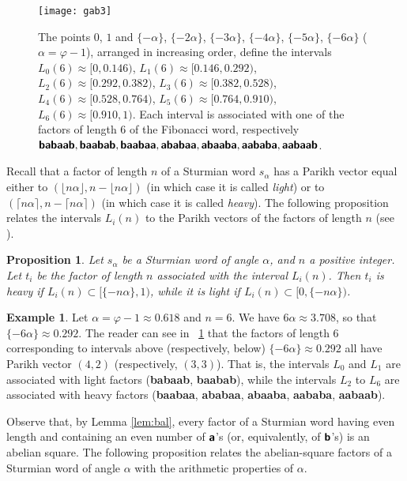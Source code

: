 \documentclass[11pt,reqno]{amsart}
\numberwithin{equation}{section}
\theoremstyle{plain}
\newtheorem{proposition}[theorem]{Proposition}
\theoremstyle{definition}
\newtheorem{example}[theorem]{Example}
\theoremstyle{remark}
\renewcommand{\phi}{\varphi}
\def\cd3#1{\textbf{\textsf{#1}}}
\def\sa#1{\cd3{#1}}
\begin{document}
\begin{figure}[!ht]
\centering
\texttt{[image: gab3]} 
\caption{%
The points $0$, $1$ and  $\{-\alpha\}$, $\{-2\alpha\}$, $\{-3\alpha\}$, $\{-4\alpha\}$, $\{-5\alpha\}$, $\{-6\alpha\}$ ($\alpha=\phi-1$),
arranged in increasing order, define the intervals $L_{0}(6)\approx[0,0.146)$, $L_{1}(6)\approx[0.146,0.292)$, $L_{2}(6)\approx[0.292,0.382)$, $L_{3}(6)\approx[0.382,0.528)$, $L_{4}(6)\approx[0.528,0.764)$, $L_{5}(6)\approx[0.764,0.910)$, $L_{6}(6)\approx[0.910,1)$. Each interval is associated with one of the factors of length $6$ of the Fibonacci word, respectively $\sa{babaab},\sa{baabab},\sa{baabaa},\sa{ababaa},\sa{abaaba},\sa{aababa},\sa{aabaab}$. \label{Fig:gab3}}
\end{figure}

Recall that a factor of length $n$ of a Sturmian word  $s_{\alpha}$ has a Parikh vector equal either to $(\lfloor n\alpha \rfloor , n-\lfloor n\alpha \rfloor )$ (in which case it is called \emph{light}) or to $(\lceil n\alpha \rceil , n-\lceil n\alpha \rceil) $ (in which case it is called \emph{heavy}).
The following proposition relates the intervals $L_{i}(n)$ to the Parikh vectors of the factors of length $n$ (see \cite{dlt,tcs16,Rigo13}).

\begin{proposition}\label{pro:main}
Let $s_{\alpha}$ be a Sturmian word of angle $\alpha$, and $n$ a positive integer.
Let $t_{i}$ be the factor of length $n$ associated with the interval $L_{i}(n)$. Then $t_{i}$ is
  heavy if  $L_{i}(n)\subset [\{-n\alpha\},1)$, while it is light if  $L_{i}(n)\subset [0,\{-n\alpha\})$.
\end{proposition}


\begin{example}
 Let $\alpha=\phi-1\approx 0.618$ and $n=6$. We have $6\alpha\approx 3.708$, so that $\{-6\alpha\}\approx 0.292$. The reader can see in \figurename~\ref{Fig:gab3} that the factors of length $6$ 
corresponding to intervals above (respectively, below) $\{-6\alpha\}\approx 0.292$ all have Parikh vector $(4,2)$ (respectively, $(3,3)$). That is, the intervals $L_{0}$ and $L_{1}$ are associated with light factors (\sa{babaab}, \sa{baabab}), while the intervals $L_{2}$ to $L_{6}$ are associated with  heavy factors (\sa{baabaa}, \sa{ababaa}, \sa{abaaba}, \sa{aababa}, \sa{aabaab}). 
\end{example}


Observe that, by Lemma \ref{lem:bal}, every factor of a Sturmian word having even length and containing an even number of $\sa{a}$'s (or, equivalently, of $\sa{b}$'s) is an abelian square. The following proposition relates the abelian-square factors of a Sturmian word of angle $\alpha$  with the arithmetic properties of $\alpha$.
\end{document}
